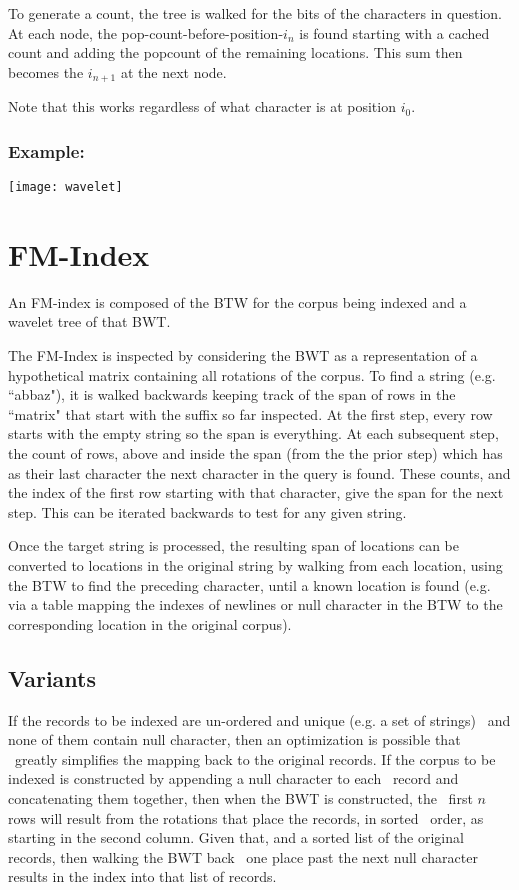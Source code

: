 \documentclass[12pt]{article}
\begin{document}
To generate a count, the tree is walked for the bits of the characters in question.
At each node, the pop-count-before-position-$i_n$ is found starting with a cached
 count and adding the popcount of the remaining locations.
This sum then becomes the $i_{n+1}$ at the next node.

Note that this works regardless of what character is at position $i_0$.

\subsubsection{Example:}
\texttt{[image: wavelet]}

\section{FM-Index}

An FM-index is composed of the BTW for the corpus being indexed and a wavelet
 tree of that BWT.

The FM-Index is inspected by considering the BWT as a representation of a
 hypothetical matrix containing all rotations of the corpus.
To find a string (e.g. ``abbaz"), it is walked backwards keeping track of the
 span of rows in the ``matrix" that start with the suffix so far inspected.
At the first step, every row starts with the empty string so the span is everything.
At each subsequent step, the count of rows, above and inside the span (from the
 the prior step) which has as their last character the next character in the
 query is found.
These counts, and the index of the first row starting with that character, give
 the span for the next step.
This can be iterated backwards to test for any given string.

Once the target string is processed, the resulting span of locations can be
 converted to locations in the original string by walking from each location,
 using the BTW to find the preceding character, until a known location is found
 (e.g. via a table mapping the indexes of newlines or null character in the BTW
 to the corresponding location in the original corpus).

\subsection{Variants}

If the records to be indexed are un-ordered and unique (e.g. a set of strings)
 and none of them contain null character, then an optimization is possible that
 greatly simplifies the mapping back to the original records.
If the corpus to be indexed is constructed by appending a null character to each
 record and concatenating them together, then when the BWT is constructed, the
 first $n$ rows will result from the rotations that place the records, in sorted
 order, as starting in the second column.
Given that, and a sorted list of the original records, then walking the BWT back
 one place past the next null character results in the index into that list of
 records.
\end{document}
